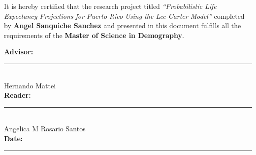 \vspace{1.8cm}

{\fontsize{12}{16}\selectfont
  It is hereby certified that the research project titled
  \textit{``Probabilistic Life Expectancy Projections for Puerto Rico
  Using the Lee-Carter Model''} completed by
  \textbf{Angel Sanquiche Sanchez}
  and presented in this document fulfills all the requirements of the
  \textbf{Master of Science in Demography}.
}

\vspace{2cm}

\begin{flushright}
\begin{minipage}{0.65\textwidth}

  \textbf{Advisor:}\\[20pt]
  \noindent\rule{8cm}{0.4pt}\\
  {\small %
  Hernando Mattei}\\[1.4cm]

  \textbf{Reader:}\\[20pt]
  \noindent\rule{8cm}{0.4pt}\\
  {\small %
  Angelica M Rosario Santos}\\[1.4cm]

  \textbf{Date:}\\[20pt]
  \noindent\rule{8cm}{0.4pt}

\end{minipage}
\end{flushright}

\newpage
\setcounter{page}{1}